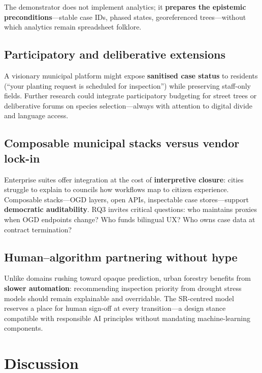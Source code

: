 \documentclass[12pt,a4paper]{article}
\begin{document}
The demonstrator does not implement analytics; it \textbf{prepares the epistemic preconditions}---stable case IDs, phased states, georeferenced trees---without which analytics remain spreadsheet folklore.

\subsection{Participatory and deliberative extensions}

A visionary municipal platform might expose \textbf{sanitised case status} to residents (``your planting request is scheduled for inspection'') while preserving staff-only fields. Further research could integrate participatory budgeting for street trees \cite{sintomer2010} or deliberative forums on species selection---always with attention to digital divide and language access.

\subsection{Composable municipal stacks versus vendor lock-in}

Enterprise suites offer integration at the cost of \textbf{interpretive closure}: cities struggle to explain to councils how workflows map to citizen experience. Composable stacks---OGD layers, open APIs, inspectable case stores---support \textbf{democratic auditability}. RQ3 invites critical questions: who maintains proxies when OGD endpoints change? Who funds bilingual UX? Who owns case data at contract termination?

\subsection{Human--algorithm partnering without hype}

Unlike domains rushing toward opaque prediction, urban forestry benefits from \textbf{slower automation}: recommending inspection priority from drought stress models should remain explainable and overridable. The SR-centred model reserves a place for human sign-off at every transition---a design stance compatible with responsible AI principles \cite{floridi2019} without mandating machine-learning components.

\section{Discussion}
\label{sec:discussion}
\end{document}
